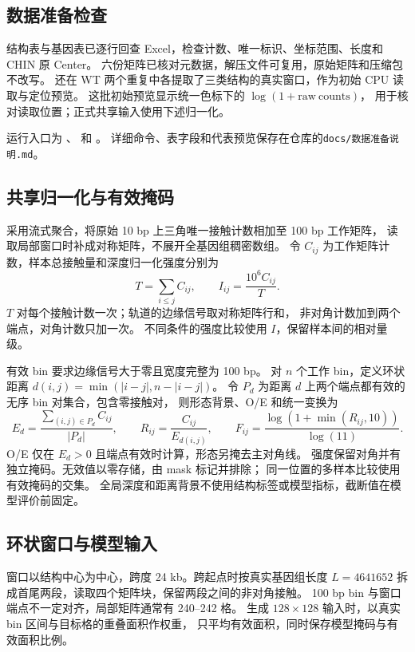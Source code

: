 \subsection{数据准备检查}
结构表与基因表已逐行回查 Excel，检查计数、唯一标识、坐标范围、长度和 CHIN 原 Center。
六份矩阵已核对元数据，解压文件可复用，原始矩阵和压缩包不改写。
还在 WT 两个重复中各提取了三类结构的真实窗口，作为初始 CPU 读取与定位预览。
这批初始预览显示统一色标下的 $\log(1+\mathrm{raw\ counts})$，
用于核对读取位置；正式共享输入使用下述归一化。

运行入口为 、
 和 。
详细命令、表字段和代表预览保存在仓库的\texttt{docs/数据准备说明.md}。

\subsection{共享归一化与有效掩码}
采用流式聚合，将原始 10 bp 上三角唯一接触计数相加至 100 bp 工作矩阵，
读取局部窗口时补成对称矩阵，不展开全基因组稠密数组。
令 $C_{ij}$ 为工作矩阵计数，样本总接触量和深度归一化强度分别为
\[
  T=\sum_{i\leq j}C_{ij},\qquad I_{ij}=\frac{10^6 C_{ij}}{T}.
\]
$T$ 对每个接触计数一次；轨道的边缘信号取对称矩阵行和，
非对角计数加到两个端点，对角计数只加一次。
不同条件的强度比较使用 $I$，保留样本间的相对量级。

有效 bin 要求边缘信号大于零且宽度完整为 100 bp。
对 $n$ 个工作 bin，定义环状距离 $d(i,j)=\min(|i-j|,n-|i-j|)$。
令 $P_d$ 为距离 $d$ 上两个端点都有效的无序 bin 对集合，包含零接触对，
则形态背景、O/E 和统一变换为
\[
  E_d=\frac{\sum_{(i,j)\in P_d}C_{ij}}{|P_d|},\qquad
  R_{ij}=\frac{C_{ij}}{E_{d(i,j)}},\qquad
  F_{ij}=\frac{\log(1+\min(R_{ij},10))}{\log(11)}.
\]
O/E 仅在 $E_d>0$ 且端点有效时计算，形态另掩去主对角线。
强度保留对角并有独立掩码。无效值以零存储，由 mask 标记并排除；
同一位置的多样本比较使用有效掩码的交集。
全局深度和距离背景不使用结构标签或模型指标，截断值在模型评价前固定。

\subsection{环状窗口与模型输入}
窗口以结构中心为中心，跨度 24 kb。跨起点时按真实基因组长度 $L=4641652$
拆成首尾两段，读取四个矩阵块，保留两段之间的非对角接触。
100 bp bin 与窗口端点不一定对齐，局部矩阵通常有 240--242 格。
生成 $128\times128$ 输入时，以真实 bin 区间与目标格的重叠面积作权重，
只平均有效面积，同时保存模型掩码与有效面积比例。

